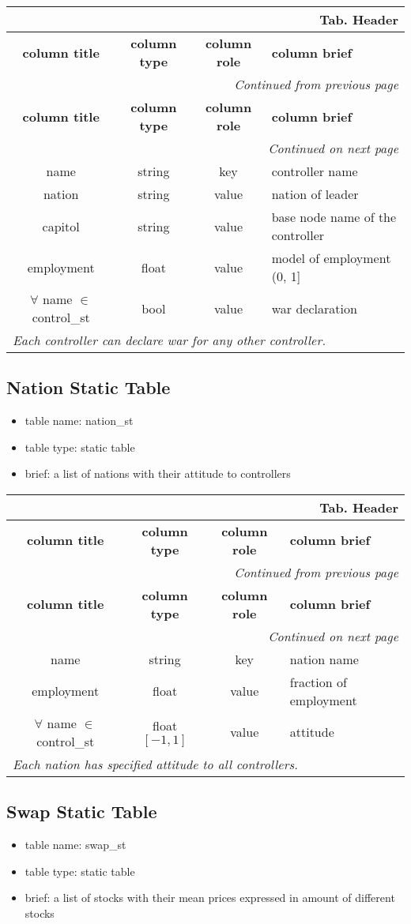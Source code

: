 \documentclass[a4paper,oneside,titlepage]{report}
\newcommand*{\LTHeaderIV}[5]{
  \multicolumn{4}{r}{\textbf{Tab. \thesubsection} \textbf{#1}}\\    
  \hline
  \textbf{#2} & \textbf{#3} & \textbf{#4} & \textbf{#5}\\
  \hline
  
  \endfirsthead
  \multicolumn{4}{r}{\textit{Continued from previous page}}\\    
  \hline
  \textbf{#2} & \textbf{#3} & \textbf{#4} & \textbf{#5}\\
  \hline
  \endhead
  \hline
  \multicolumn{4}{r}{\textit{Continued on next page}}\\
  \endfoot
  \hline
  \endlastfoot  
}
\begin{document}
\vspace{-0.5cm}
\begin{longtable}{ |c|c|c|l| } 
  \LTHeaderIV{Header}{column title}{column type}{column role}{column brief}                    
  name & string & key & controller name\\
  nation & string & value & nation of leader\\
  capitol & string & value & base node name of the controller\\
  employment & float & value & model of employment (0, 1]\\
  $\forall$ name $\in$ control\_st & bool & value & war declaration\\
  \multicolumn{4}{|l|}{\textit{Each controller can declare war for any other controller.}}\\
\end{longtable}        

\subsection{Nation Static Table}
\begin{itemize}
  \setlength{\itemsep}{0pt}
  \setlength{\parskip}{0pt}
\item table name: nation\_st  
\item table type: static table   
\item brief: a list of nations with their attitude to controllers 
\end{itemize}

\vspace{-0.5cm}
\begin{longtable}{ |c|c|c|l| } 
  \LTHeaderIV{Header}{column title}{column type}{column role}{column brief}                    
  name & string & key & nation name\\
  employment & float & value & fraction of employment\\
  $\forall$ name $\in$ control\_st  & float $[-1, 1]$ & value & attitude\\
  \multicolumn{4}{|l|}{\textit{Each nation has specified attitude to all controllers.}}\\
\end{longtable}        


\subsection{Swap Static Table}
\begin{itemize}
  \setlength{\itemsep}{0pt}
  \setlength{\parskip}{0pt}
\item table name: swap\_st  
\item table type: static table   
\item brief: a list of stocks with their mean prices expressed in amount of different stocks 
\end{itemize}
\end{document}
